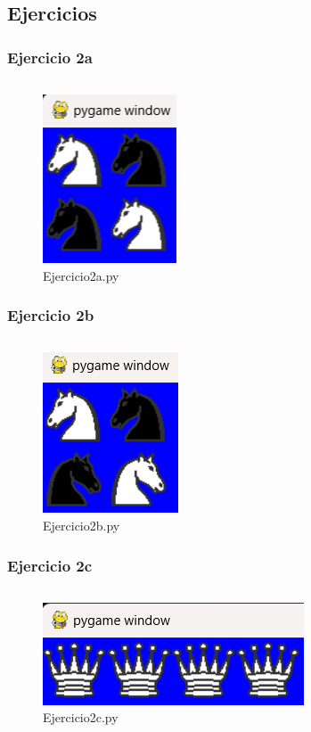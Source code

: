 \documentclass{article}
\newenvironment{block}{\captionsetup{type=listing}}{}
\begin{document}
\subsection{Ejercicios}
\subsubsection{Ejercicio 2a}
\begin{block}
	\inputminted{python}{../Tarea-del-Ajedrez/Ejercicio2a.py}
	\begin{figure}[H]
		\centering
		\includegraphics[height=0.3\textwidth]{img/2a.png}
		\caption{Ejercicio2a.py}
	\end{figure}
\end{block}
\subsubsection{Ejercicio 2b}
\begin{block}
	\inputminted{python}{../Tarea-del-Ajedrez/Ejercicio2b.py}
	\begin{figure}[H]
		\centering
		\includegraphics[height=0.3\textwidth]{img/2b.png}
		\caption{Ejercicio2b.py}
	\end{figure}
\end{block}
\pagebreak
\subsubsection{Ejercicio 2c}
\begin{block}
	\inputminted{python}{../Tarea-del-Ajedrez/Ejercicio2c.py}
	\begin{figure}[H]
		\centering
		\includegraphics[height=0.2\textwidth]{img/2c.png}
		\caption{Ejercicio2c.py}
	\end{figure}
\end{block}
\end{document}
